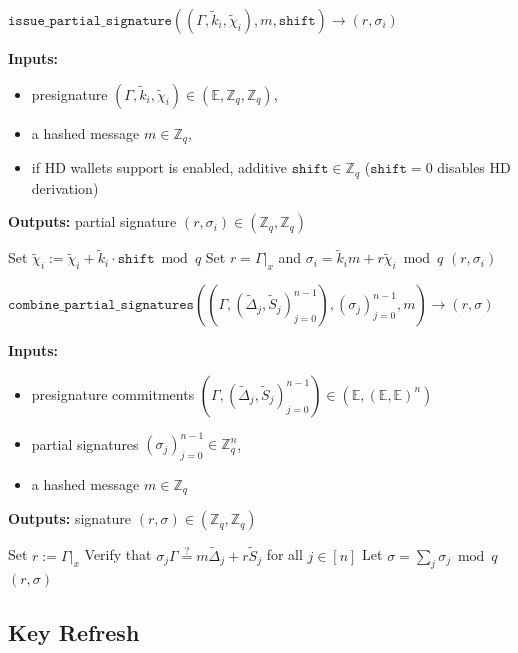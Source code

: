 \documentclass[11pt]{article}
\newenvironment{inlineAlgorithm}{}{}
\newcommand{\algoName}[1]{#1 \par}
\newcommand{\algoInputsList}[1]{
    {\small \bf Inputs:} 
        \begin{itemize}[noitemsep,topsep=0pt]
            #1
        \end{itemize}
}
\newcommand{\algoOutputs}[1]{
    {\small \bf Outputs:} #1 \par
}
\newcommand{\fn}[1]{\ensuremath{\mathtt{#1}}}
\newcommand{\var}[1]{\ensuremath{\mathtt{#1}}}
\newcommand{\affineX}[1]{#1|_{\textit{x}}}
\newcommand{\E}{\mathbb{E}}
\newcommand{\Z}{\mathbb{Z}}
\newcommand{\?}[1]{\stackrel{?}{#1}}
\begin{document}
\begin{description}

\item
\begin{inlineAlgorithm}
\algoName{$\fn{issue\_partial\_signature}((\Gamma, \tilde k_i, \tilde \chi_i), m, \var{shift}) \to (r, \sigma_i)$}
\algoInputsList{
    \item presignature $(\Gamma, \tilde k_i, \tilde \chi_i) \in (\E, \Z_q, \Z_q)$,
    \item a hashed message $m \in \Z_q$,
    \item if HD wallets support is enabled, additive $\var{shift} \in \Z_q$ ($\var{shift} = 0$ disables HD derivation)
}
\algoOutputs{partial signature $(r, \sigma_i) \in (\Z_q, \Z_q)$}
\begin{algorithmic}[1]
    \State Set $\tilde \chi_i := \tilde \chi_i + \tilde k_i \cdot \var{shift} \bmod q$
\EndIf
\State Set $r = \affineX{\Gamma}$ and $\sigma_i = \tilde k_i m + r \tilde \chi_i \bmod q$
\State \Return $(r, \sigma_i)$
\end{algorithmic}
\end{inlineAlgorithm}

\item
\begin{inlineAlgorithm}
\algoName{$\fn{combine\_partial\_signatures}(
    (\Gamma, (\tilde \Delta_j, \tilde S_j)_{j=0}^{n-1}),
    (\sigma_j)_{j=0}^{n-1},
    m
) \to (r, \sigma)$}
\algoInputsList{
    \item presignature commitments $(\Gamma, (\tilde \Delta_j, \tilde S_j)_{j=0}^{n-1}) \in (\E, (\E, \E)^n)$
    \item partial signatures $(\sigma_j)_{j=0}^{n-1} \in \Z_q^n$,
    \item a hashed message $m \in \Z_q$
}
\algoOutputs{signature $(r, \sigma) \in (\Z_q, \Z_q)$}
\begin{algorithmic}[1]
\State Set $r := \affineX{\Gamma}$
\State Verify that $\sigma_j \Gamma \? = m \tilde \Delta_j + r \tilde S_j$ for all $j \in [n]$
\State Let $\sigma = \sum_j \sigma_j \bmod q$
\State \Return $(r, \sigma)$
\end{algorithmic}
\end{inlineAlgorithm}

\end{description}

\subsection{Key Refresh}
\label{sec:key-refresh}
\end{document}
